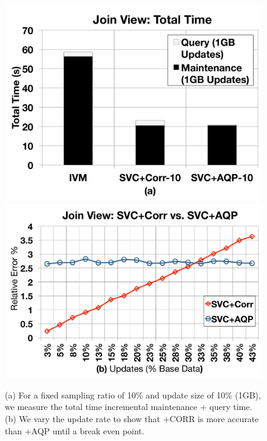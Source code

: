 \begin{figure}[t] %
\centering
 \includegraphics[scale=0.13]{exp/msj_4.pdf}
 \includegraphics[scale=0.13]{exp/msj_6.pdf}\vspace{-.5em}
  \caption{(a) For a fixed sampling ratio of 10\% and update size of 10\% (1GB), we measure the total time incremental maintenance + query time. (b) We vary the update rate to show that \svcnospace+CORR is more accurate than \svcnospace+AQP until a break even point. \vspace{-2em} \label{exp-1-total}}
\end{figure}



